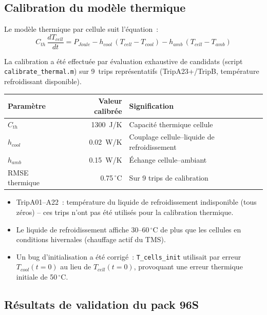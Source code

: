 \documentclass[a4paper,11pt]{article}
\begin{document}
\subsection{Calibration du modèle thermique}

Le modèle thermique par cellule suit l'équation~:
\[
  C_{th}\,\frac{dT_{cell}}{dt}
  = P_{Joule}
  - h_{cool}\,(T_{cell} - T_{cool})
  - h_{amb}\,(T_{cell} - T_{amb})
\]

La calibration a été effectuée par évaluation exhaustive de candidats (script
\texttt{calibrate\_thermal.m}) sur 9~trips représentatifs (TripA23+/TripB,
température refroidissant disponible).

\begin{center}
\small\renewcommand{\arraystretch}{1.3}
\begin{tabular}{lrl}
\toprule
\textbf{Paramètre} & \textbf{Valeur calibrée} & \textbf{Signification} \\
\midrule
$C_{th}$ & 1300~J/K & Capacité thermique cellule \\
$h_{cool}$ & 0.02~W/K & Couplage cellule--liquide de refroidissement \\
$h_{amb}$ & 0.15~W/K & Échange cellule--ambiant \\
\midrule
RMSE thermique & 0.75\,$^\circ$C & Sur 9 trips de calibration \\
\bottomrule
\end{tabular}
\end{center}

\begin{warnbox}
\begin{itemize}[nosep]
  \item TripA01--A22~: température du liquide de refroidissement indisponible
    (tous zéros) -- ces trips n'ont pas été utilisés pour la calibration thermique.
  \item Le liquide de refroidissement affiche 30--60\,$^\circ$C de plus que les cellules
    en conditions hivernales (chauffage actif du TMS).
  \item Un bug d'initialisation a été corrigé~: \texttt{T\_cells\_init} utilisait
    par erreur $T_{cool}(t=0)$ au lieu de $T_{cell}(t=0)$, provoquant une erreur
    thermique initiale de 50\,$^\circ$C.
\end{itemize}
\end{warnbox}

\subsection{Résultats de validation du pack 96S}
\end{document}
